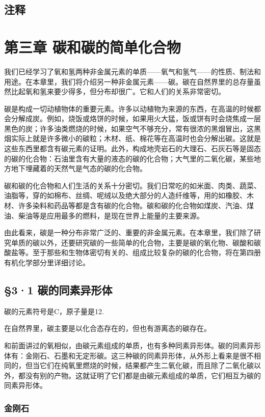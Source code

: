 \section{注释}

\chapter{第三章 碳和碳的简单化合物}

我们已经学习了氧和氢两种非金属元素的单质------氧气和氢气------的性质、制法和用途。在本章里，我们将介绍另一种非金属元素------碳。碳在自然界里的总存量虽然比起氧和氢来要少得多，但分布却很广。它和人们的关系非常密切。

碳是构成一切动植物体的重要元素。许多以动植物为来源的东西，在高温的时候都会分解成炭。例如，烧饭或烙饼的时候，如果用火大猛，饭或饼有时会烧焦成一层黑色的炭；许多油类燃烧的时候，如果空气不够充分，常有很浓的黑烟冒出，这黑烟实际上就是许多微小的碳粒；木材、纸、棉花等在高温时也会分解出碳。这就是这些东西里都含有碳元素的证明。此外，构成地壳岩石的大理石、石灰石等是固态的碳的化合物：石油里含有大量的液态的碳的化合物；大气里的二氧化碳，某些地方地下埋藏着的天然气是气态的碳的化合物。

碳和碳的化合物和人们生活的关系十分密切。我们日常吃的如米面、肉类、蔬菜、油脂等，穿的如棉布、丝绸、呢绒以及绝大部分的人造纤维等，用的如橡胶、木材、许多染料和药品等都是含有碳的化合物。碳和碳的化合物如煤炭、汽油、煤油、柴油等是应用最多的燃料，是现在世界上能量的主要来源。

由此看来，碳是一种分布非常广泛的、重要的非金属元素。在本章里，我们除了研究单质的碳以外，还要研究碳的一些简单的化合物，主要是碳的氧化物、碳酸和碳酸盐等。至于那些和生物体密切有关的、组成比较复杂的碳的化合物，将在第四册有机化学部分里详细讨论。

\section{§3·1 碳的同素异形体}

碳的元素符号是C，原子量是12.

在自然界里，碳主要是以化合态存在的，但也有游离态的碳存在。

和前面讲过的氧相似，由碳元素组成的单质，也有多种同素异形体。碳的同素异形体有：金刚石、石墨和无定形碳。这三种碳的同素异形体，从外形上看来是很不相同的，但当它们在纯氧里燃烧的时候，结果都产生二氧化碳，而且除了二氧化碳以外，都没有别的产物。这就证明了它们都是由碳元素组成的单质，它们相互为碳的同素异形体。

\subsection{金刚石}

